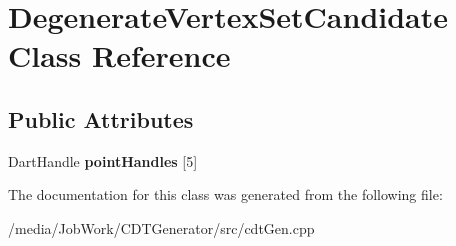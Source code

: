 \hypertarget{classDegenerateVertexSetCandidate}{\section{Degenerate\-Vertex\-Set\-Candidate Class Reference}
\label{classDegenerateVertexSetCandidate}
}
\subsection*{Public Attributes}
\begin{DoxyCompactItemize}
\item 
\hypertarget{classDegenerateVertexSetCandidate_a078e453fbbe2554574cd53a647326e88}{Dart\-Handle {\bfseries point\-Handles} \mbox{[}5\mbox{]}}\label{classDegenerateVertexSetCandidate_a078e453fbbe2554574cd53a647326e88}

\end{DoxyCompactItemize}


The documentation for this class was generated from the following file\-:\begin{DoxyCompactItemize}
\item 
/media/\-Job\-Work/\-C\-D\-T\-Generator/src/cdt\-Gen.\-cpp\end{DoxyCompactItemize}
